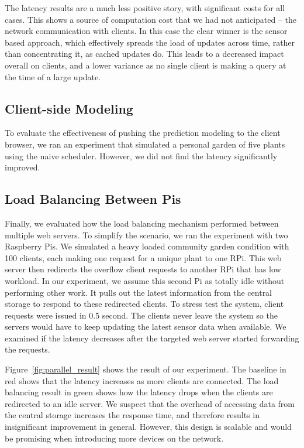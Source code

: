 \documentclass[a4paper]{acm_proc_article-sp}
\begin{document}
The latency results are a much less positive story, with significant costs for all cases.  This shows a source of computation cost that we had not anticipated -- the network communication with clients.  In this case the clear winner is the sensor based approach, which effectively spreads the load of updates across time, rather than concentrating it, as cached updates do.  This leads to a decreased impact overall on clients, and a lower variance as no single client is making a query at the time of a large update.

\subsection{Client-side Modeling}

To evaluate the effectiveness of pushing the prediction modeling to the client browser, we ran an experiment that simulated a personal garden of five plants using the naive scheduler.  However, we did not find the latency significantly improved. 

\subsection{Load Balancing Between Pis}

Finally, we evaluated how the load balancing mechanism performed between multiple web servers. To simplify the scenario, we ran the experiment with two Raspberry Pis. We simulated a heavy loaded community garden condition with 100 clients, each making one request for a unique plant to one RPi. This web server then redirects the overflow client requests to another RPi that has low workload. In our experiment, we assume this second Pi as totally idle without performing other work. It pulls out the latest information from the central storage to respond to these redirected clients. To stress test the system, client requests were issued in 0.5 second. The clients never leave the system so the servers would have to keep updating the latest sensor data when available. We examined if the latency decreases after the targeted web server started forwarding the requests.

Figure~\ref{fig:parallel_result} shows the result of our experiment. The baseline in red shows that the latency increases as more clients are connected. The load balancing result in green shows how the latency drops when the clients are redirected to an idle server. We suspect that the overhead of accessing data from the central storage increases the response time, and therefore results in insignificant improvement in general. However, this design is scalable and would be promising when introducing more devices on the network.
\end{document}
